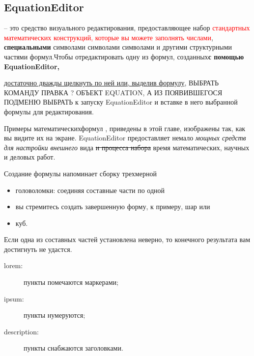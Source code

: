 \documentclass[12pt]{article}
\begin{document}
\bfseries
\begin{flushleft} 
\section{EquationEditor}
 – это средство визуального редактирования, предоставляющее набор \textcolor{red}{стандартных математических конструкций, которые вы можете заполнять числами},\textbf{ специальными} {\rm символами} символами символами и другими структурными частями формул.Чтобы отредактировать одну из формул, созданных{\bf с помощью EquationEditor,} \end{flushleft} \underline{достаточно дважды щелкнуть по ней или, выделив формулу}, \uppercase {выбрать команду Правка ? Объект Equation, а из появившегося подменю выбрать}  к запуску EquationEditor и вставке в {\Huge него} выбранной формулы для редактирования.\begin{flushright} Примеры математических{\tiny формул} , приведены в этой главе, изображены так, как вы видите их на экране. EquationEditor предоставляет немало \textit{мощных средств для настройки внешнего} вида \sout {и процесса набора}  время  математических, научных и деловых  работ.\end{flushright} Создание формулы напоминает сборку трехмерной
 \begin{itemize}
\item  головоломки: соединяя составные части по одной
\item вы стремитесь создать завершенную форму, к примеру, шар или
\item куб.
\end{itemize}
   Если одна из составных частей установлена неверно, то конечного результата вам достигнуть не удастся.
\begin{description}
\item[lorem:]
пункты помечаются маркерами;
\item[ipsum:]
пункты нумеруются;
\item[description:]
пункты снабжаются заголовками.
\end{description}
\end{document}
